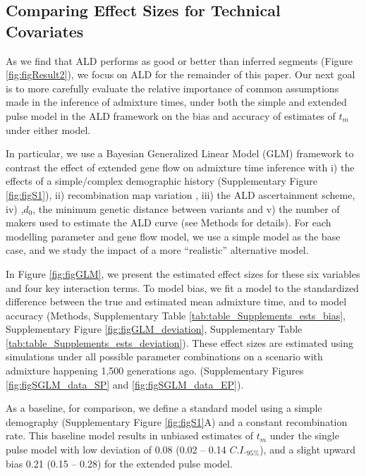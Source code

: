 \documentclass[11pt]{article}
\begin{document}
\subsection{Comparing Effect Sizes for Technical Covariates}\label{comparing effect sizes}

As we find that ALD performs as good or better than inferred segments (Figure \ref{fig:figResult2}), we focus on ALD for the remainder of this paper. Our next goal is to more carefully evaluate the relative importance of common assumptions made in the inference of admixture times, under both the simple and extended pulse model in the ALD framework on the bias and accuracy of estimates of $t_m$ under either model.

In particular, we use a Bayesian Generalized Linear Model (GLM) framework to contrast the effect of extended gene flow on admixture time inference with i) the effects of a simple/complex demographic history (Supplementary Figure \ref{fig:figS1}), ii) recombination map variation , iii)  the ALD ascertainment scheme,  iv) ,$d_0$, the minimum genetic distance between variants and v) the number of makers used to estimate the ALD curve (see Methods for details). For each modelling parameter and gene flow model, we use a simple model as the base case, and we study the impact of a more ``realistic'' alternative model.

In Figure \ref{fig:figGLM}, we present the estimated effect sizes for these six variables and four key interaction terms. To model bias, we fit a model to the standardized difference between the true and estimated mean admixture time, and to model accuracy (Methods, Supplementary Table \ref{tab:table_Supplements_ests_bias}, Supplementary Figure \ref{fig:figGLM_deviation}, Supplementary Table \ref{tab:table_Supplements_ests_deviation}). These effect sizes are estimated using simulations under all possible parameter combinations on a scenario with admixture happening 1,500 generations ago. (Supplementary Figures \ref{fig:figSGLM_data_SP} and \ref{fig:figSGLM_data_EP}).

As a baseline, for comparison, we define a standard model using a simple demography (Supplementary Figure \ref{fig:figS1}A) and a constant recombination rate.  This baseline model results in unbiased estimates of $t_m$ under the single pulse model with low deviation  of 0.08 (0.02 -- 0.14 $C.I._{95\%}$), and a slight upward bias 0.21 (0.15 -- 0.28) for the extended pulse model.
\end{document}
